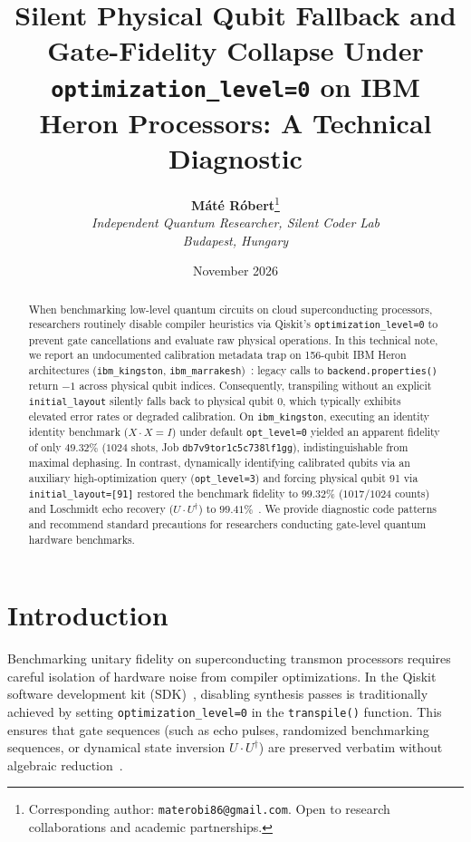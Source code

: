 \documentclass[10pt,twocolumn]{article}
\title{\textbf{Silent Physical Qubit Fallback and Gate-Fidelity Collapse Under \texttt{optimization\_level=0} on IBM Heron Processors: A Technical Diagnostic}}
\author{
  \textbf{M\'at\'e R\'obert}\thanks{Corresponding author: \texttt{materobi86@gmail.com}. Open to research collaborations and academic partnerships.}\\
  \textit{Independent Quantum Researcher, Silent Coder Lab}\\
  \textit{Budapest, Hungary}
}
\date{November 2026}
\begin{document}
\maketitle

\begin{abstract}
When benchmarking low-level quantum circuits on cloud superconducting processors, researchers routinely disable compiler heuristics via Qiskit's \texttt{optimization\_level=0} to prevent gate cancellations and evaluate raw physical operations. In this technical note, we report an undocumented calibration metadata trap on 156-qubit IBM Heron architectures (\texttt{ibm\_kingston}, \texttt{ibm\_marrakesh})~\cite{heron2024,krantz_guide}: legacy calls to \texttt{backend.properties()} return $-1$ across physical qubit indices. Consequently, transpiling without an explicit \texttt{initial\_layout} silently falls back to physical qubit 0, which typically exhibits elevated error rates or degraded calibration. On \texttt{ibm\_kingston}, executing an identity identity benchmark ($X \cdot X = I$) under default \texttt{opt\_level=0} yielded an apparent fidelity of only $49.32\%$ ($1024$ shots, Job \texttt{db7v9tor1c5c738lf1gg}), indistinguishable from maximal dephasing. In contrast, dynamically identifying calibrated qubits via an auxiliary high-optimization query (\texttt{opt\_level=3}) and forcing physical qubit 91 via \texttt{initial\_layout=[91]} restored the benchmark fidelity to $99.32\%$ ($1017/1024$ counts) and Loschmidt echo recovery ($U \cdot U^{\dagger}$) to $99.41\%$~\cite{loschmidt_gorin2006}. We provide diagnostic code patterns and recommend standard precautions for researchers conducting gate-level quantum hardware benchmarks.
\end{abstract}

\section{Introduction}

Benchmarking unitary fidelity on superconducting transmon processors requires careful isolation of hardware noise from compiler optimizations. In the Qiskit software development kit (SDK)~\cite{cross2018qiskit}, disabling synthesis passes is traditionally achieved by setting \texttt{optimization\_level=0} in the \texttt{transpile()} function. This ensures that gate sequences (such as echo pulses, randomized benchmarking sequences, or dynamical state inversion $U \cdot U^{\dagger}$) are preserved verbatim without algebraic reduction~\cite{loschmidt_gorin2006,knill2008rb}.
\end{document}
